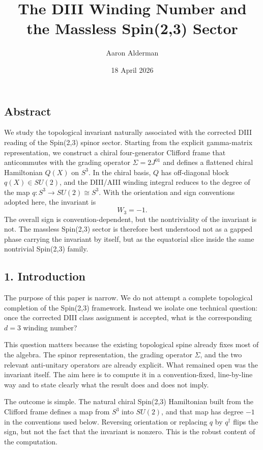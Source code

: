 \documentclass[
]{article}
\title{The DIII Winding Number and the Massless Spin(2,3) Sector}
\author{Aaron Alderman}
\date{18 April 2026}
\begin{document}
\maketitle

\subsection{Abstract}\label{abstract}

We study the topological invariant naturally associated with the
corrected DIII reading of the Spin(2,3) spinor sector. Starting from the
explicit gamma-matrix representation, we construct a chiral
four-generator Clifford frame that anticommutes with the grading
operator \(\Sigma = 2J^{01}\) and defines a flattened chiral Hamiltonian
\(Q(X)\) on \(S^3\). In the chiral basis, \(Q\) has off-diagonal block
\(q(X) \in SU(2)\), and the DIII/AIII winding integral reduces to the
degree of the map \(q : S^3 \to SU(2) \cong S^3\). With the orientation
and sign conventions adopted here, the invariant is \[
W_3 = -1.
\] The overall sign is convention-dependent, but the nontriviality of
the invariant is not. The massless Spin(2,3) sector is therefore best
understood not as a gapped phase carrying the invariant by itself, but
as the equatorial slice inside the same nontrivial Spin(2,3) family.

\subsection{1. Introduction}\label{introduction}

The purpose of this paper is narrow. We do not attempt a complete
topological completion of the Spin(2,3) framework. Instead we isolate
one technical question: once the corrected DIII class assignment is
accepted, what is the corresponding \(d=3\) winding number?

This question matters because the existing topological spine already
fixes most of the algebra. The spinor representation, the grading
operator \(\Sigma\), and the two relevant anti-unitary operators are
already explicit. What remained open was the invariant itself. The aim
here is to compute it in a convention-fixed, line-by-line way and to
state clearly what the result does and does not imply.

The outcome is simple. The natural chiral Spin(2,3) Hamiltonian built
from the Clifford frame defines a map from \(S^3\) into \(SU(2)\), and
that map has degree \(-1\) in the conventions used below. Reversing
orientation or replacing \(q\) by \(q^\dagger\) flips the sign, but not
the fact that the invariant is nonzero. This is the robust content of
the computation.
\end{document}
